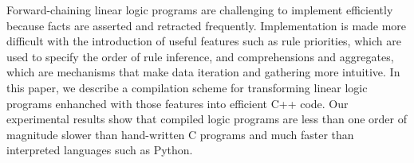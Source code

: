 Forward-chaining linear logic programs are challenging to implement efficiently
because facts are asserted and retracted frequently.  Implementation is made
more difficult with the introduction of useful features such as rule priorities,
which are used to specify the order of rule inference, and comprehensions and
aggregates, which are mechanisms that make data iteration and gathering more intuitive.  In
this paper, we describe a compilation scheme for transforming linear logic
programs enhanched with those features into efficient C++ code. Our experimental
results show that compiled logic programs are less than one order of magnitude
slower than hand-written C programs and much faster than interpreted
languages such as Python.

